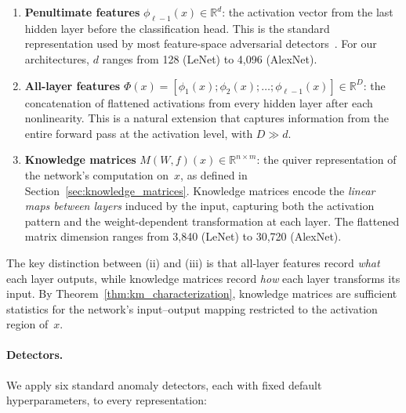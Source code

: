 \begin{enumerate}[label=(\roman*)]
    \item \textbf{Penultimate features} $\phi_{\ell-1}(x) \in \mathbb{R}^d$: the activation vector from the last hidden layer before the classification head.
    This is the standard representation used by most feature-space adversarial detectors~\citep{lee2018simple,ma2018characterizing}.
    For our architectures, $d$ ranges from 128 (LeNet) to 4{,}096 (AlexNet).

    \item \textbf{All-layer features} $\Phi(x) = [\phi_1(x); \phi_2(x); \ldots; \phi_{\ell-1}(x)] \in \mathbb{R}^D$: the concatenation of flattened activations from every hidden layer after each nonlinearity.
    This is a natural extension that captures information from the entire forward pass at the activation level, with $D \gg d$.

    \item \textbf{Knowledge matrices} $M(W,f)(x) \in \mathbb{R}^{n \times m}$: the quiver representation of the network's computation on~$x$, as defined in Section~\ref{sec:knowledge_matrices}.
    Knowledge matrices encode the \emph{linear maps between layers} induced by the input, capturing both the activation pattern and the weight-dependent transformation at each layer.
    The flattened matrix dimension ranges from 3{,}840 (LeNet) to 30{,}720 (AlexNet).
\end{enumerate}

The key distinction between (ii) and (iii) is that all-layer features record \emph{what} each layer outputs, while knowledge matrices record \emph{how} each layer transforms its input.
By Theorem~\ref{thm:km_characterization}, knowledge matrices are sufficient statistics for the network's input--output mapping restricted to the activation region of~$x$.

\paragraph{Detectors.}
We apply six standard anomaly detectors, each with fixed default hyperparameters, to every representation:

